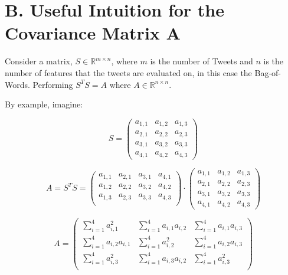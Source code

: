 \documentclass[11pt,a4paper]{article}
\begin{document}
\section*{B. Useful Intuition for the Covariance Matrix $\mathbf{A}$}
Consider a matrix, $S\in \mathbb{R}^{m\times n}$, where $m$ is the number of Tweets and $n$ is the number of features that the tweets are evaluated on, in this case the Bag-of-Words. Performing $S^TS = A$ where $A \in \mathbb{R}^{n\times n}$. 

By example, imagine:

\begin{equation}
S = \left( \begin{matrix}
a_{1, 1} & a_{1, 2} & a_{1, 3} \\ 
a_{2, 1} & a_{2, 2} & a_{2, 3} \\
a_{3, 1} & a_{3, 2} & a_{3, 3} \\
a_{4, 1} & a_{4, 2} & a_{4, 3} 
\end{matrix} \right)
\end{equation}

\begin{equation}
A = S^TS =
 \left( \begin{matrix}
a_{1, 1} & a_{2, 1} & a_{3, 1} & a_{4, 1} \\ 
a_{1, 2} & a_{2, 2} & a_{3, 2} & a_{4, 2} \\ 
a_{1, 3} & a_{2, 3} & a_{3, 3} & a_{4, 3} \\ 

\end{matrix} \right)
\cdot \left( \begin{matrix}
a_{1, 1} & a_{1, 2} & a_{1, 3} \\ 
a_{2, 1} & a_{2, 2} & a_{2, 3} \\
a_{3, 1} & a_{3, 2} & a_{3, 3} \\
a_{4, 1} & a_{4, 2} & a_{4, 3} 
\end{matrix} \right)
\end{equation}


\begin{equation}
A =
\left( \begin{matrix}
\sum_{i=1}^4 a_{i,1}^2& \sum_{i=1}^4 a_{i,1} a_{i,2} &  \sum_{i=1}^4 a_{i,1} a_{i,3} \\ 
\sum_{i=1}^4 a_{i,2}a_{i, 1} & \sum_{i=1}^4 a_{i,2}^2 &  \sum_{i=1}^4 a_{i,2} a_{i,3} \\ 
\sum_{i=1}^4 a_{i,3}^2& \sum_{i=1}^4 a_{i,3} a_{i,2} &  \sum_{i=1}^4  a_{i,3}^2 \\ 
\end{matrix} \right)
\end{equation}
\end{document}
